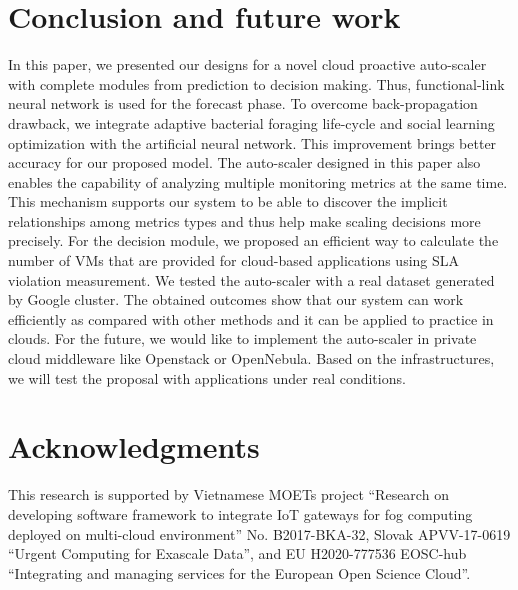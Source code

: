 \documentclass[runningheads]{llncs}
\begin{document}
\section{Conclusion and future work}
\label{conclusion}

In this paper, we presented our designs for a novel cloud proactive auto-scaler with complete modules from prediction to decision making. Thus, functional-link neural network is used for the forecast phase. To overcome back-propagation drawback, we integrate adaptive bacterial foraging life-cycle and social learning optimization with the artificial neural network. This improvement brings better accuracy for our proposed model. The auto-scaler designed in this paper also enables the capability of analyzing multiple monitoring metrics at the same time. This mechanism supports our system to be able to discover the implicit relationships among metrics types and thus help make scaling decisions more precisely. For the decision module, we proposed an efficient way to calculate the number of VMs that are provided for cloud-based applications using SLA violation measurement. We tested the auto-scaler with a real dataset generated by Google cluster. The obtained outcomes show that our system can work efficiently as compared with other methods and it can be applied to practice in clouds. For the future, we would like to implement the auto-scaler in private cloud middleware like Openstack or OpenNebula. Based on the infrastructures, we will test the proposal with applications under real conditions.


\section*{Acknowledgments} This research is supported by 
Vietnamese MOETs project ``Research on developing software framework to integrate IoT gateways for fog computing deployed on multi-cloud environment'' No. B2017-BKA-32,
Slovak APVV-17-0619 ``Urgent Computing for Exascale Data'', and
EU H2020-777536 EOSC-hub ``Integrating and managing services for the European Open Science Cloud''.


%
%


\end{document}

